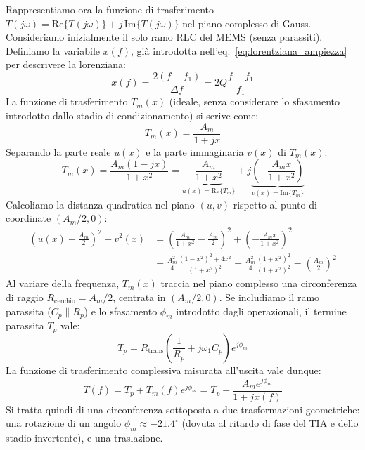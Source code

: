 \documentclass[11pt,a4paper]{article}
\begin{document}
\noindent Rappresentiamo ora la funzione di trasferimento $T(j\omega) = \mathrm{Re}\{T(j\omega)\} + j\,\mathrm{Im}\{T(j\omega)\}$ nel piano complesso di Gauss. 
Consideriamo inizialmente il solo ramo RLC del MEMS (senza parassiti). Definiamo la variabile $x(f)$, già introdotta nell'eq.~\eqref{eq:lorentziana_ampiezza} per descrivere la lorenziana:
\begin{equation}
    \label{eq:coordinata_x_lorentz}
    x(f) = \frac{2(f - f_1)}{\Delta f} = 2Q \frac{f - f_1}{f_1}
\end{equation}
La funzione di trasferimento $T_m(x)$ (ideale, senza considerare lo sfasamento introdotto dallo stadio di condizionamento) si scrive come:
\begin{equation}
    T_m(x) = \frac{A_m}{1 + j x}
\end{equation}
Separando la parte reale $u(x)$ e la parte immaginaria $v(x)$ di $T_m(x)$:
\begin{equation}
    T_m(x) = \frac{A_m(1 - jx)}{1 + x^2} = \underbrace{\frac{A_m}{1 + x^2}}_{u(x) = \mathrm{Re}\{T_m\}} + j \underbrace{\left(-\frac{A_m x}{1 + x^2}\right)}_{v(x) = \mathrm{Im}\{T_m\}}
\end{equation}
Calcoliamo la distanza quadratica nel piano $(u, v)$ rispetto al punto di coordinate $(A_m/2, 0)$:
\begin{align}
    \left(u(x) - \frac{A_m}{2}\right)^2 + v^2(x) &= \left(\frac{A_m}{1 + x^2} - \frac{A_m}{2}\right)^2 + \left(-\frac{A_m x}{1 + x^2}\right)^2 \nonumber \\
    &= \frac{A_m^2}{4} \frac{(1 - x^2)^2 + 4x^2}{(1 + x^2)^2} = \frac{A_m^2}{4} \frac{(1 + x^2)^2}{(1 + x^2)^2} = \left(\frac{A_m}{2}\right)^2
\end{align}
Al variare della frequenza, $T_m(x)$ traccia nel piano complesso una circonferenza di raggio $R_{\text{cerchio}} = A_m/2$, centrata in $(A_m/2, 0)$. Se includiamo il ramo parassita ($C_p \parallel R_p$) e lo sfasamento $\phi_m$ introdotto dagli operazionali, il termine parassita $T_p$ vale:
\begin{equation}
    T_p = R_{\text{trans}} \left( \frac{1}{R_p} + j\omega_1 C_p \right) e^{j\phi_m}
\end{equation}
La funzione di trasferimento complessiva misurata all'uscita vale dunque:
\begin{equation}
    \label{eq:cerchio_traslato_complesso}
    T(f) = T_p + T_m(f) e^{j\phi_m} = T_p + \frac{A_m e^{j\phi_m}}{1 + j x(f)}
\end{equation}
Si tratta quindi di una circonferenza sottoposta a due trasformazioni geometriche: una rotazione di un angolo $\phi_m \approx -21.4^\circ$ (dovuta al ritardo di fase del TIA e dello stadio invertente), e una traslazione.
\vspace{0.3cm}
\end{document}
